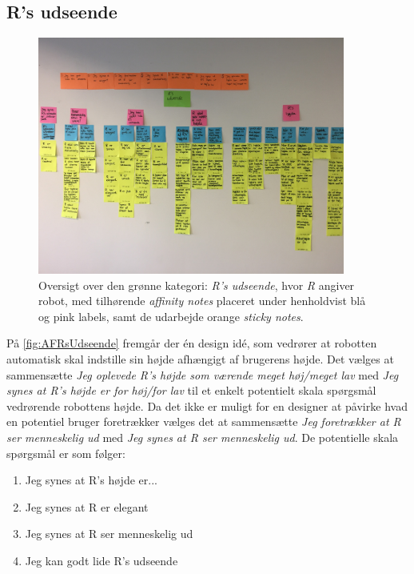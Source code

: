 \subsection{R's udseende}
\label{ParametreRsUdseende}
%
\begin{figure}[H]
\centering
\includegraphics[width = 0.9\textwidth]{Figure/AffinityDiagram/RsUdseende} 
\caption{Oversigt over den grønne kategori: \textit{R's udseende}, hvor \textit{R} angiver robot, med tilhørende \textit{affinity notes} placeret under henholdvist blå og pink labels, samt de udarbejde orange \textit{sticky notes}.}
\label{fig:AFRsUdseende}
\end{figure}
\noindent
%
På \autoref{fig:AFRsUdseende} fremgår der én design idé, som vedrører at robotten automatisk skal indstille sin højde afhængigt af brugerens højde. Det vælges at sammensætte \textit{Jeg oplevede R's højde som værende meget høj/meget lav} med \textit{Jeg synes at R's højde er for høj/for lav} til et enkelt potentielt skala spørgsmål vedrørende robottens højde. Da det ikke er muligt for en designer at påvirke hvad en potentiel bruger foretrækker vælges det at sammensætte \textit{Jeg foretrækker at R ser menneskelig ud} med \textit{Jeg synes at R ser menneskelig ud}. De potentielle skala spørgsmål er som følger: \blankline
% 
\begin{enumerate}
  \item Jeg synes at R's højde er... 
  \item Jeg synes at R er elegant
  \item Jeg synes at R ser menneskelig ud
  \item Jeg kan godt lide R's udseende\blankline
\end{enumerate}
